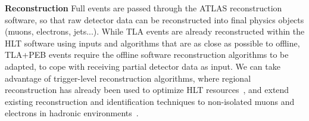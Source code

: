 \textbf{Reconstruction} Full events are passed through the ATLAS reconstruction software, so that raw detector data can be reconstructed into final physics objects (muons, electrons, jets...). 
While TLA events are already reconstructed within the HLT software using inputs and algorithms that are as close as possible to offline, 
TLA+PEB events require the offline software reconstruction algorithms to be adapted, to cope with receiving partial detector data as input. 
We can take advantage of trigger-level reconstruction algorithms, where regional reconstruction has already been used to optimize HLT resources~\cite{ToBeCited}, %
and extend existing reconstruction and identification techniques to non-isolated muons and electrons in hadronic environments~\cite{ToBeCited}. %

